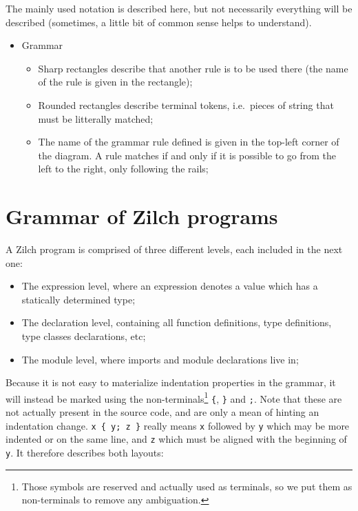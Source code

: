 The mainly used notation is described here, but not necessarily everything will be described (sometimes, a little bit of common sense helps to understand).

\begin{itemize}
  \item Grammar
        \begin{figure}[H]
          \centering
        \end{figure}
        \begin{itemize}
          \item Sharp rectangles describe that another rule is to be used there (the name of the rule is given in the rectangle);
          \item Rounded rectangles describe terminal tokens, i.e.\ pieces of string that must be litterally matched;
          \item The name of the grammar rule defined is given in the top-left corner of the diagram.
                A rule matches if and only if it is possible to go from the left to the right, only following the rails;
        \end{itemize}
\end{itemize}

\chapter{Grammar of Zilch programs}\label{chap:zilch-grammar}

A Zilch program is comprised of three different levels, each included in the next one:
\begin{itemize}
  \item The expression level, where an expression denotes a value which has a statically determined type;
  \item The declaration level, containing all function definitions, type definitions, type classes declarations, etc;
  \item The module level, where imports and module declarations live in;
\end{itemize}

\noindent Because it is not easy to materialize indentation properties in the grammar, it will instead be marked using the non-terminals\footnote{Those symbols are reserved and actually used as terminals, so we put them as non-terminals to remove any ambiguation.} \texttt{\{}, \texttt{\}} and \texttt{;}.
Note that these are not actually present in the source code, and are only a mean of hinting an indentation change.
\texttt{x \{ y; z \}} really means \texttt{x} followed by \texttt{y} which may be more indented or on the same line, and \texttt{z} which must be aligned with the beginning of \texttt{y}.
It therefore describes both layouts:

